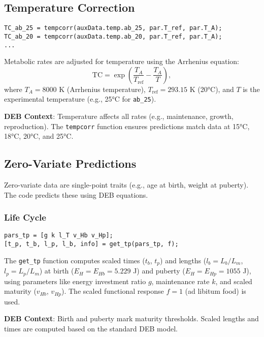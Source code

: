 \documentclass[11pt]{article}
\begin{document}
\subsection{Temperature Correction}
\begin{verbatim}
TC_ab_25 = tempcorr(auxData.temp.ab_25, par.T_ref, par.T_A);
TC_ab_20 = tempcorr(auxData.temp.ab_20, par.T_ref, par.T_A);
...
\end{verbatim}
Metabolic rates are adjusted for temperature using the Arrhenius equation:
\begin{equation}
\text{TC} = \exp\left(\frac{T_A}{T_{\text{ref}}} - \frac{T_A}{T}\right),
\end{equation}
where $T_A = 8000$ K (Arrhenius temperature), $T_{\text{ref}} = 293.15$ K (20°C), and $T$ is the experimental temperature (e.g., 25°C for \texttt{ab\_25}).

\textbf{DEB Context}: Temperature affects all rates (e.g., maintenance, growth, reproduction). The \texttt{tempcorr} function ensures predictions match data at 15°C, 18°C, 20°C, and 25°C.

\subsection{Zero-Variate Predictions}
Zero-variate data are single-point traits (e.g., age at birth, weight at puberty). The code predicts these using DEB equations.

\subsubsection{Life Cycle}
\begin{verbatim}
pars_tp = [g k l_T v_Hb v_Hp];
[t_p, t_b, l_p, l_b, info] = get_tp(pars_tp, f);
\end{verbatim}
The \texttt{get\_tp} function computes scaled times ($t_b$, $t_p$) and lengths ($l_b = L_b / L_m$, $l_p = L_p / L_m$) at birth ($E_H = E_{Hb} = 5.229$ J) and puberty ($E_H = E_{Hp} = 1055$ J), using parameters like energy investment ratio $g$, maintenance rate $k$, and scaled maturity ($v_{Hb}$, $v_{Hp}$). The scaled functional response $f = 1$ (ad libitum food) is used.

\textbf{DEB Context}: Birth and puberty mark maturity thresholds. Scaled lengths and times are computed based on the standard DEB model.
\end{document}
